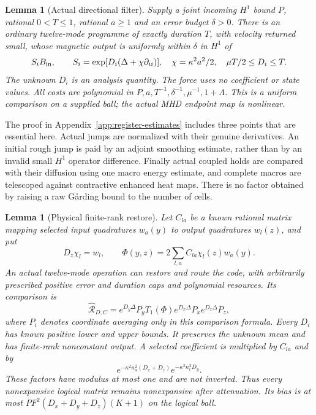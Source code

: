 \documentclass[11pt,a4paper]{amsart}
\newtheorem{lemma}[theorem]{Lemma}
\theoremstyle{definition}
\theoremstyle{remark}
\numberwithin{equation}{section}
\begin{document}
\begin{lemma}[Actual directional filter]\label{lem:directional-filter}
Supply a joint incoming $H^1$ bound $P$, rational $0<T\le1$, rational
$a\ge1$ and an error budget $\delta>0$.  There is an ordinary twelve-mode
programme of exactly duration $T$, with velocity returned small, whose
magnetic output is uniformly within $\delta$ in $H^1$ of
\begin{equation}\label{eq:directional-comparison}
 S_iB_{\rm in},\qquad
 S_i=\exp[D_i(\Delta+\chi\partial_{ii})],\quad
 \chi=\kappa^2a^2/2,\quad \mu T/2\le D_i\le T.
\end{equation}
The unknown $D_i$ is an analysis quantity.  The force uses no coefficient
or state values.  All costs are polynomial in
$P,a,T^{-1},\delta^{-1},\mu^{-1},1+\Lambda$.  This is a uniform
comparison on a supplied ball; the actual MHD endpoint map is nonlinear.
\end{lemma}

The proof in Appendix~\ref{app:register-estimates} includes three points
that are essential here.  Actual jumps are normalized with their genuine
derivatives.  An initial rough jump is paid by an adjoint smoothing estimate,
rather than by an invalid small $H^1$ operator difference.  Finally actual
coupled holds are compared with their diffusion using one macro energy
estimate, and complete macros are telescoped against contractive enhanced
heat maps.  There is no factor obtained by raising a raw G\aa rding bound
to the number of cells.

\begin{lemma}[Physical finite-rank restore]\label{lem:register-restore}
Let $C_{la}$ be a known rational matrix mapping selected input quadratures
$w_a(y)$ to output quadratures $w_l(z)$, and put
\begin{equation}\label{eq:restore-potential}
 D_z\chi_l=w_l,\qquad
 \Phi(y,z)=2\sum_{l,a}C_{la}\chi_l(z)w_a(y).
\end{equation}
An actual twelve-mode operation can restore and route the code, with
arbitrarily prescribed positive error and duration caps and polynomial
resources.  Its comparison is
\begin{equation}\label{eq:restore-regularized}
 \widehat{\mathcal R}_{D,C}
 =e^{D_y\Delta}P_yT_1(\Phi)
       e^{D_x\Delta}P_xe^{D_z\Delta}P_z,
\end{equation}
where $P_i$ denotes coordinate averaging only in this comparison formula.
Every $D_i$ has known positive lower and upper bounds.  It preserves the
unknown mean and has finite-rank nonconstant output.  A selected coefficient
is multiplied by $C_{la}$ and by
\begin{equation}\label{eq:restore-attenuation}
 e^{-\kappa^2 n_a^2(D_x+D_z)}e^{-\kappa^2 n_l^2D_y}.
\end{equation}
These factors have modulus at most one and are not inverted.  Thus every
nonexpansive logical matrix remains nonexpansive after attenuation.  Its
bias is at most $P F^2(D_x+D_y+D_z)(K+1)$ on the logical ball.
\end{lemma}
\end{document}
